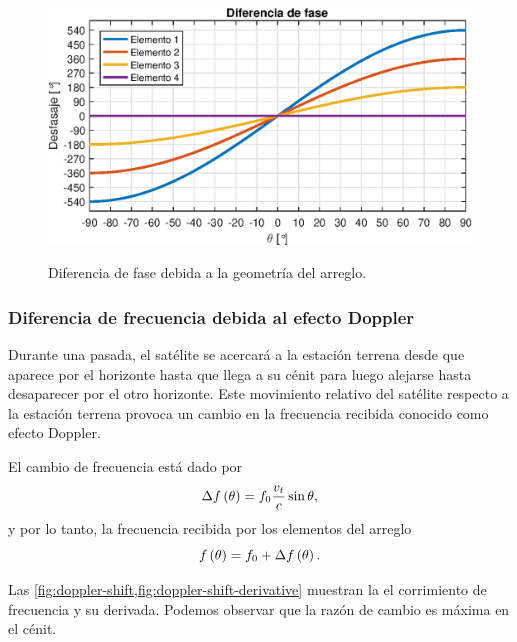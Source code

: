\documentclass{article}
\newenvironment{standalone}{\begin{preview}}{\end{preview}}
\begin{document}
\begin{standalone}
  \begin{figure}[!htbp]
    \centering
    \includegraphics[width=\linewidth, height=70mm, keepaspectratio]{../images/phase-offset.eps}
    \caption{Diferencia de fase debida a la geometría del arreglo.}
    \label{fig:phase-offset}
  \end{figure}

  \subsubsection{Diferencia de frecuencia debida al efecto Doppler}

  Durante una pasada, el satélite se acercará a la estación terrena desde que aparece por el horizonte hasta que llega a su cénit para luego alejarse hasta desaparecer por el otro horizonte. Este movimiento relativo del satélite respecto a la estación terrena provoca un cambio en la frecuencia recibida conocido como efecto Doppler.

  El cambio de frecuencia está dado por \cite{popescu2016}
  \begin{equation}
    \Delta f \left( \theta \right) = f_0 \frac{v_t}{c} \sin{\theta},
    \tagaddtext{[\si{\hertz}]}
  \end{equation}
  y por lo tanto, la frecuencia recibida por los elementos del arreglo
  \begin{equation}
    f \left( \theta \right) = f_0 + \Delta f \left( \theta \right).
    \tagaddtext{[\si{\hertz}]}
  \end{equation}

  Las \cref{fig:doppler-shift,fig:doppler-shift-derivative} muestran la el corrimiento de frecuencia y su derivada. Podemos observar que la razón de cambio es máxima en el cénit.


\end{standalone}
\end{document}
